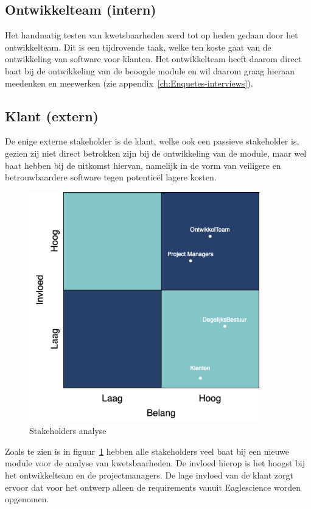 \subsection{Ontwikkelteam (intern)}\label{subsec:ontwikkelteam-(intern)}
Het handmatig testen van kwetsbaarheden werd tot op heden gedaan door het ontwikkelteam. Dit is een tijdrovende taak, welke ten koste gaat van de ontwikkeling van software voor klanten. Het ontwikkelteam heeft daarom direct baat bij de ontwikkeling van de beoogde module en wil daarom graag hieraan meedenken en meewerken (zie appendix~\ref{ch:Enquetes-interviews}).

\subsection{Klant (extern)}\label{subsec:klant-(extern)}
De enige externe stakeholder is de klant, welke ook een passieve stakeholder is, gezien zij niet direct betrokken zijn bij de ontwikkeling van de module, maar wel baat hebben bij de uitkomst hiervan, namelijk in de vorm van veiligere en betrouwbaardere software tegen potentieël lagere kosten.
\smallskip
\begin{figure}
    \myfloatalign
    \includegraphics[width=10cm]{gfx/stakeholderanalyse}
    \caption{Stakeholders analyse}
    \label{fig:StakeholderAnalyse}
\end{figure}
Zoals te zien is in figuur~\ref{fig:StakeholderAnalyse} hebben alle stakeholders veel baat bij een nieuwe module voor de analyse van kwetsbaarheden. De invloed hierop is het hoogst bij het ontwikkelteam en de projectmanagers. De lage invloed van de klant zorgt ervoor dat voor het ontwerp alleen de requirements vanuit Eaglescience worden opgenomen.

